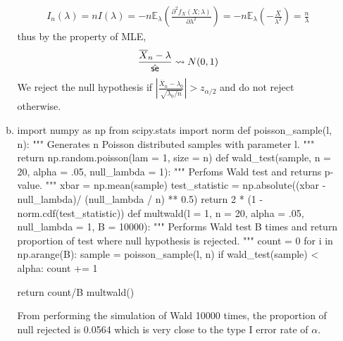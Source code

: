 \documentclass[a4paper,10pt]{article}
\theoremstyle{definition}
\begin{document}
\begin{enumerate}
\begin{enumerate}[(a)]
\begin{align*}
I_n(\lambda) = nI(\lambda)=-n\mathbb{E}_\lambda\left(\frac{\partial^2 f_X(X;\lambda)}{\partial \lambda^2}\right) = -n\mathbb{E}_\lambda\left(-\frac{X}{\lambda^2}\right)=\frac{n}{\lambda}
\end{align*}
thus by the property of  {\sffamily MLE}, 
\begin{align*}
\frac{\overline{X}_n-\lambda}{\hat{\text{\sffamily se}}} \leadsto N(0,1)
\end{align*}
We reject the null hypothesis if $\left|\frac{\overline{X}_n-\lambda_0}{\sqrt{\lambda_0/n}}\right|>z_{\alpha/2}$ and do not reject otherwise.
\item 
\begin{python}
import numpy as np
from scipy.stats import norm
def poisson_sample(l, n):
    """
    Generates n Poisson distributed samples with parameter l.
    """
    return np.random.poisson(lam = 1, size = n)
def wald_test(sample, n = 20, alpha = .05, null_lambda = 1):
    """
    Perfoms Wald test and returns p-value.
    """
    xbar = np.mean(sample)
    test_statistic = np.absolute((xbar - null_lambda)/ (null_lambda / n) ** 0.5)
    return  2 * (1 - norm.cdf(test_statistic))
def multwald(l = 1, n = 20, alpha = .05, null_lambda = 1, B = 10000):
    """
    Performs Wald test B times and return proportion of test where null hypothesis is rejected.
    """
    count = 0
    for i in np.arange(B):
        sample = poisson_sample(l, n)
        if wald_test(sample) < alpha:
            count += 1

    return count/B
multwald()            
\end{python}
From performing the simulation of Wald 10000 times, the proportion of null rejected is 0.0564 which is very close to the type I error rate of $\alpha$.
\end{enumerate}

\newpage


\end{enumerate}
\end{document}
